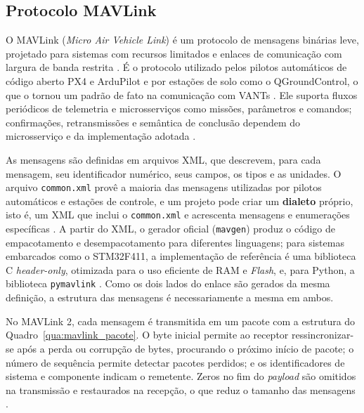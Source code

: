 
\subsection{Protocolo MAVLink}\label{subsec:mavlink}

O MAVLink (\textit{Micro Air Vehicle Link}) é um protocolo de mensagens binárias leve, projetado para sistemas com recursos limitados e enlaces de comunicação com largura de banda restrita \cite{koubaa2019, mavlinkguide}. É o protocolo utilizado pelos pilotos automáticos de código aberto PX4 e ArduPilot e por estações de solo como o QGroundControl, o que o tornou um padrão de fato na comunicação com VANTs \cite{koubaa2019}. Ele suporta fluxos periódicos de telemetria e microsserviços como missões, parâmetros e comandos; confirmações, retransmissões e semântica de conclusão dependem do microsserviço e da implementação adotada \cite{mavlinkguide}.

As mensagens são definidas em arquivos XML, que descrevem, para cada mensagem, seu identificador numérico, seus campos, os tipos e as unidades. O arquivo \texttt{common.xml} provê a maioria das mensagens utilizadas por pilotos automáticos e estações de controle, e um projeto pode criar um \textbf{dialeto} próprio, isto é, um XML que inclui o \texttt{common.xml} e acrescenta mensagens e enumerações específicas \cite{mavlinkguide}. A partir do XML, o gerador oficial (\texttt{mavgen}) produz o código de empacotamento e desempacotamento para diferentes linguagens; para sistemas embarcados como o STM32F411, a implementação de referência é uma biblioteca C \textit{header-only}, otimizada para o uso eficiente de RAM e \textit{Flash}, e, para Python, a biblioteca \texttt{pymavlink} \cite{koubaa2019, mavlinkguide}. Como os dois lados do enlace são gerados da mesma definição, a estrutura das mensagens é necessariamente a mesma em ambos.

No MAVLink 2, cada mensagem é transmitida em um pacote com a estrutura do Quadro~\ref{qua:mavlink_pacote}. O byte inicial permite ao receptor ressincronizar-se após a perda ou corrupção de bytes, procurando o próximo início de pacote; o número de sequência permite detectar pacotes perdidos; e os identificadores de sistema e componente indicam o remetente. Zeros no fim do \textit{payload} são omitidos na transmissão e restaurados na recepção, o que reduz o tamanho das mensagens \cite{mavlinkguide}.


